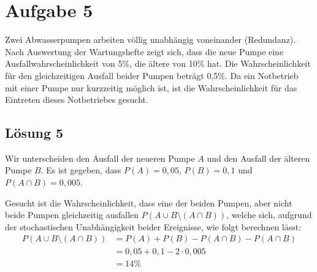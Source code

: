 \documentclass[main.tex]{subfiles}
\begin{document}
\section{Aufgabe 5}
Zwei Abwasserpumpen arbeiten völlig unabhängig voneinander (Redundanz). Nach Auswertung der Wartungshefte zeigt sich, dass die neue Pumpe eine Ausfallwahrscheinlichkeit von 5\%, die ältere von 10\% hat.
Die Wahrscheinlichkeit für den gleichzeitigen Ausfall beider Pumpen beträgt 0,5\%. Da ein Notbetrieb mit einer Pumpe nur kurzzeitig
möglich ist, ist die Wahrscheinlichkeit für das Eintreten dieses Notbetriebes gesucht.

\subsection{Lösung 5}
Wir unterscheiden den Ausfall der neueren Pumpe $A$ und den Ausfall der älteren Pumpe $B$. Es ist gegeben, dass $P(A) = 0,05$, $P(B) = 0,1$ und $P(A\cap B) = 0,005$. 

Gesucht ist die Wahrscheinlichkeit, dass eine der beiden Pumpen, aber nicht beide Pumpen gleichzeitig ausfallen $P(A\cup B\setminus(A\cap B))$, welche sich, aufgrund der stochastischen Unabhängigkeit beider Ereignisse, wie folgt berechnen lässt:
$$\begin{aligned}
    P(A\cup B\setminus (A\cap B)) &= P(A) + P(B) - P(A\cap B) - P(A\cap B)\\
    &= 0,05 + 0,1 - 2\cdot 0,005 \\
    &= 14\%
\end{aligned}
$$
\end{document}
